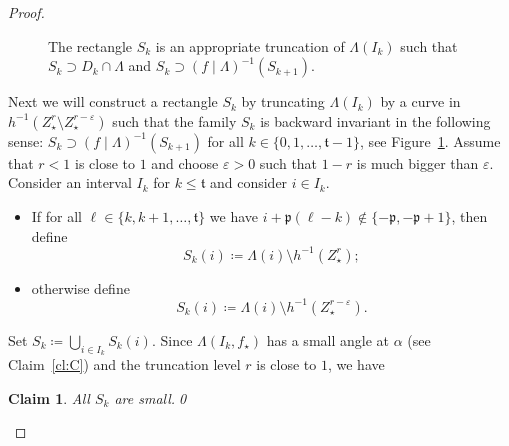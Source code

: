 \documentclass[]{amsart}
\newcommand{\bLambda}{{\mathbb{\Lambda}}}
\newcommand{\str}{{\star}}
\newcommand{\pp}{\mathfrak{p}}
\renewcommand{\tt}{\mathfrak{t}}
\newtheorem{claim}{Claim}
\theoremstyle{remark}
\numberwithin{equation}{section}
\theoremstyle{definition}
\begin{document}
\begin{proof}
\begin{figure}[t!]
\caption{The rectangle $S_k$ is an appropriate truncation of $\Lambda(I_k)$ such that $S_k\supset D_k \cap \bLambda$ and $S_k\supset (f\mid \bLambda)^{-1}(S_{k+1})$.} \label{Fig:DfnS_k}
\end{figure}



Next we will construct a rectangle $S_k$ by truncating $\Lambda(I_k)$ by a curve in ${h^{-1}(Z_\str^{r}\setminus Z_\str^{r-\varepsilon})}$ such that the family $S_k$ is backward invariant in the following sense: ${S_k\supset (f\mid \bLambda)^{-1}(S_{k+1})}$ for all $k\in \{0,1,\dots, \tt-1\}$, see Figure~\ref{Fig:DfnS_k}.  Assume that $r <1$ is close to $1$ and choose $\varepsilon>0$ such that $1-r $ is much bigger than $\varepsilon$. Consider an interval $I_k$ for $k\le \tt$ and consider $i\in I_k$. 
\begin{itemize}
\item  If for all $\ell\in \{ k,k+1,\dots, \tt\}$ we have $i+\pp (\ell-k) \not \in \{-\pp,-\pp+1\}$, then define \[S_k(i)\coloneqq \Lambda(i)\setminus h^{-1}(Z_\str^{r  });\]
\item  otherwise define \[S_k(i) \coloneqq \Lambda(i)\setminus h^{-1}(Z_\str^{r  -\varepsilon}).\] 
\end{itemize}

Set $\displaystyle S_k\coloneqq \bigcup _{i\in I_k} S_k(i)$. Since $\Lambda(I_k, f_\str)$ has a small angle at $\alpha$ (see Claim~\ref{cl:C}) and the truncation level $r$ is close to $1$, we have

\begin{claim}
\label{cl:S_k is small} All $S_k$ are small.\qed
\end{claim}




\end{proof}
\end{document}
